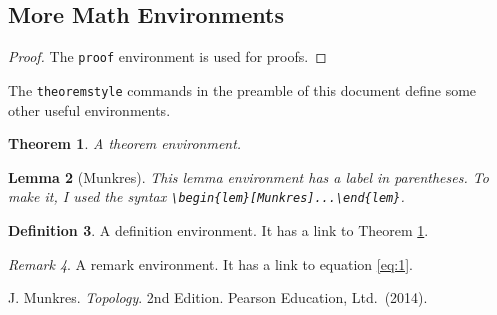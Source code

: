 \documentclass[a4paper,10pt,leqno]{article}
\numberwithin{equation}{section}
\theoremstyle{plain}
\newtheorem{thm}{Theorem}[section]
\newtheorem{lem}[thm]{Lemma}
\theoremstyle{definition}
\newtheorem{df}[thm]{Definition}
\theoremstyle{remark}
\newtheorem{rem}[thm]{Remark}
\begin{document}
\subsection{More Math Environments} 

\begin{proof} 
The \texttt{proof} environment is used for proofs.
\end{proof} 

The \texttt{theoremstyle} commands in the preamble of this document define some other useful environments.

\begin{thm}\label{thm:1}
A theorem environment.
\end{thm}

\begin{lem}[Munkres]
This lemma environment has a label in parentheses.
To make it, I used the syntax \verb|\begin{lem}[Munkres]...\end{lem}|.
\end{lem}

\begin{df}
A definition environment.
It has a link to Theorem \ref{thm:1}.
\end{df}

\begin{rem}
A remark environment.
It has a link to equation \eqref{eq:1}.
\end{rem}

\frenchspacing
\begin{thebibliography}{11}
	J. Munkres.
	\textsl{Topology}.
	2nd Edition.
	Pearson Education, Ltd.\ (2014).
	
	
\end{thebibliography}
\end{document}
